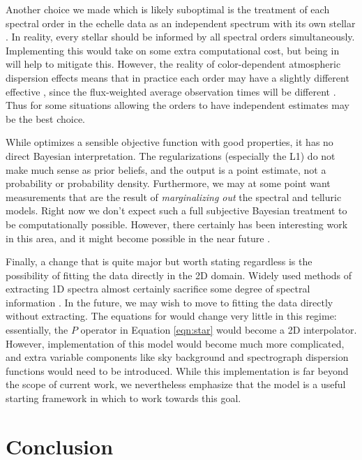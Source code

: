 \documentclass[twocolumn]{aastex62}
\begin{document}
Another choice we made which is likely suboptimal is the treatment of each spectral order in the echelle data as an independent spectrum with its own stellar \RV. 
In reality, every stellar \RV should be informed by all spectral orders simultaneously. 
Implementing this would take on some extra computational cost, but being in \TF will help to mitigate this. 
However, the reality of color-dependent atmospheric dispersion effects means that in practice each order may have a slightly different effective \RV, since the flux-weighted average observation times will be different \citep{Blackman2017}. 
Thus for some situations allowing the orders to have independent \RV estimates may be the best choice.

While \wobble optimizes a sensible objective function with good properties, it has no direct Bayesian interpretation. 
The regularizations (especially the L1) do not make much sense as prior beliefs, and the output is a point estimate, not a probability or probability density. 
Furthermore, we may at some point want \RV measurements that are the result of \emph{marginalizing out} the spectral and telluric models. 
Right now we don't expect such a full subjective Bayesian treatment to be computationally possible.
However, there certainly has been interesting work in this area, and it might become possible in the near future \citep{Czekala2015}.

Finally, a change that is quite major but worth stating regardless is the possibility of fitting the data directly in the 2D domain. 
Widely used methods of extracting 1D spectra almost certainly sacrifice some degree of spectral information \citep{Bolton2010}.
In the future, we may wish to move to fitting the data directly without extracting. 
The equations for \wobble would change very little in this regime: essentially, the $P$ operator in Equation \ref{eqn:star} would become a 2D interpolator. 
However, implementation of this model would become much more complicated, and extra variable components like sky background and spectrograph dispersion functions would need to be introduced. 
While this implementation is far beyond the scope of current work, we nevertheless emphasize that the \wobble model is a useful starting framework in which to work towards this goal.

\section{Conclusion}
\label{s:conclusion}
\end{document}
